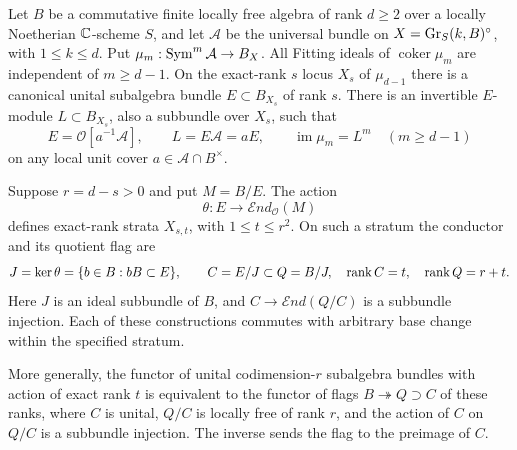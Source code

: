 \begin{theorem}
\label{thm:higher-defect-strata}
Let $B$ be a commutative finite locally free algebra of rank $d\ge2$
over a locally Noetherian $\mathbb C$-scheme $S$, and let $\mathcal A$ be the
universal bundle on $X=\operatorname{Gr}_S(k,B)^\circ$, with $1\le k\le d$.
Put $\mu_m:\operatorname{Sym}^m\mathcal A\to B_X$.
All Fitting ideals of $\operatorname{coker}\mu_m$ are independent of
$m\ge d-1$. On the exact-rank $s$ locus $X_s$ of $\mu_{d-1}$ there
is a canonical unital subalgebra bundle $E\subset B_{X_s}$ of rank $s$.
There is an invertible $E$-module $L\subset B_{X_s}$, also a subbundle
over $X_s$, such that
\begin{equation}\label{eq:stable-image-bundle}
 E=\mathcal O[a^{-1}\mathcal A],\qquad L=E\mathcal A=aE,
 \qquad \operatorname{im}\mu_m=L^m\quad(m\ge d-1)
\end{equation}
on any local unit cover $a\in\mathcal A\cap B^\times$.

Suppose $r=d-s>0$ and put $M=B/E$. The action
\[
 \theta:E\longrightarrow\mathcal E nd_{\mathcal O}(M)
\]
defines exact-rank strata $X_{s,t}$, with $1\le t\le r^2$.
On such a stratum the conductor and its quotient flag are
\begin{equation}\label{eq:conductor-flag}
 J=\ker\theta=\{b\in B:bB\subset E\},\qquad
 C=E/J\subset Q=B/J,
 \quad \operatorname{rank} C=t,\quad\operatorname{rank} Q=r+t.
\end{equation}
Here $J$ is an ideal subbundle of $B$, and $C\to\mathcal E nd(Q/C)$
is a subbundle injection. Each of these constructions commutes with
arbitrary base change within the specified stratum.

More generally, the functor of unital codimension-$r$ subalgebra
bundles with action of exact rank $t$ is equivalent to the functor of
flags $B\twoheadrightarrow Q\supset C$ of these ranks, where $C$ is
unital, $Q/C$ is locally free of rank $r$, and the action of $C$ on
$Q/C$ is a subbundle injection. The inverse sends the flag to the
preimage of $C$.
\end{theorem}
